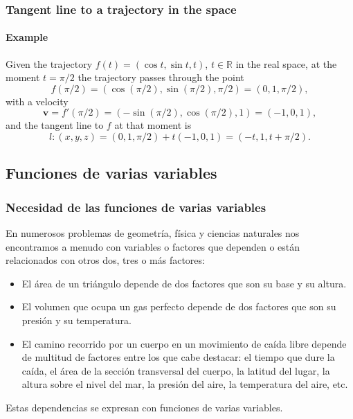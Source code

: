 \begin{frame}
\frametitle{Tangent line to a trajectory in the space}
\framesubtitle{Example}
Given the trajectory $f(t)=(\cos t, \sin t, t)$, $t\in \mathbb{R}$ in the real space, at the moment $t=\pi/2$ the trajectory passes through the point
\[
f(\pi/2)=(\cos(\pi/2),\sin(\pi/2),\pi/2)=(0,1,\pi/2),
\]
with a velocity
\[
\mathbf{v}=f'(\pi/2)=(-\sin(\pi/2),\cos(\pi/2), 1)=(-1,0,1),
\] 
and the tangent line to $f$ at that moment is 
\[
l:(x,y,z)=(0,1,\pi/2)+t(-1,0,1) = (-t,1,t+\pi/2).
\]
\begin{center}

\end{center}
\end{frame}

\subsection{Funciones de varias variables}
\begin{frame}
\frametitle{Necesidad de las funciones de varias variables}
En numerosos problemas de geometría, física y ciencias naturales nos encontramos a menudo con variables o factores que dependen o están relacionados con otros dos, tres o más factores:
\begin{itemize}
\item El área de un triángulo depende de dos factores que son su base y su altura.
\item El volumen que ocupa un gas perfecto depende de dos factores que son su presión y su temperatura.
\item El camino recorrido por un cuerpo en un movimiento de caída libre depende de multitud de factores entre los que cabe destacar: el tiempo que dure la caída, el área de la sección transversal del cuerpo, la latitud del lugar, la altura sobre el nivel del mar, la presión del aire, la temperatura del aire, etc.
\end{itemize}
Estas dependencias se expresan con funciones de varias variables.
\end{frame}


